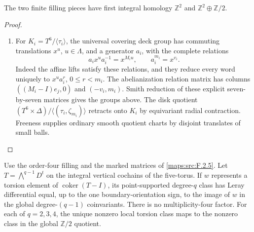 \begin{theorem}\label{night:P1.3}
The two finite filling pieces have first integral homology
$\mathbb Z^2$ and $\mathbb Z^2\oplus\mathbb Z/2$.
\end{theorem}
\begin{proof}
\begin{enumerate}[label=\arabic*.]
\item For $K_i=T^6/\langle\tau_i\rangle$, the universal covering deck group
has commuting translations $x^u$, $u\in\Lambda$, and a generator $a_i$,
with the complete relations
\[
a_ix^ua_i^{-1}=x^{M_iu},\qquad a_i^{m_i}=x^{v_i}.
\]
Indeed the affine lifts satisfy these relations, and they reduce every
word uniquely to $x^ua_i^r$, $0\leq r<m_i$.
The abelianization relation matrix has columns
$((M_i-I)e_j,0)$ and $(-v_i,m_i)$.
Smith reduction of these explicit seven-by-seven matrices gives the
groups above.  The disk quotient
$(T^6\times\Delta)/\langle(\tau_i,\zeta_{m_i})\rangle$
retracts onto $K_i$ by equivariant radial contraction.  Freeness supplies
ordinary smooth quotient charts by disjoint translates of small balls.

\end{enumerate}
\end{proof}


\begin{lemma}
\label{mapsaudit:order-four-torsion-transgression}

Use the order-four filling and the marked matrices of \cref{maps:src:F.2.5}.
Let $T=\bigwedge^{q-1}D^t$ on the integral vertical cochains of the
five-torus. If $w$ represents a torsion element of
$\operatorname{coker}(T-I)$, its point-supported degree-$q$ class has
Leray differential equal, up to the one boundary-orientation sign, to
the image of $w$ in the global degree-$(q-1)$ coinvariants. There is
no multiplicity-four factor. For each of $q=2,3,4$, the unique nonzero local torsion class maps
to the nonzero class in the global $\mathbb Z/2$ quotient.
\end{lemma}


